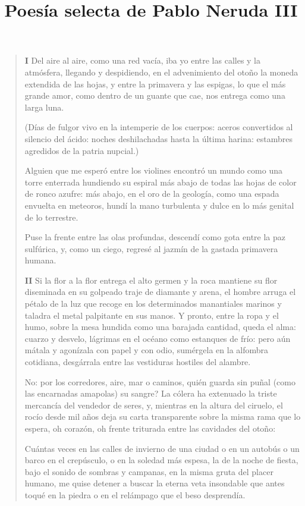 \documentclass[12pt]{article}
\date{}
\title{Poesía selecta de Pablo Neruda III}
\begin{document}
\maketitle
\tableofcontents

\clearpage
{}
\begin{verse}
\textbf{ I}
Del aire al aire, como una red vacía,  
iba yo entre las calles y la atmósfera, llegando y despidiendo,  
en el advenimiento del otoño la moneda extendida  
de las hojas, y entre la primavera y las espigas,  
lo que el más grande amor, como dentro de un guante  
que cae, nos entrega como una larga luna.  
	
(Días de fulgor vivo en la intemperie  
de los cuerpos: aceros convertidos  
al silencio del ácido:  
noches deshilachadas hasta la última harina:  
estambres agredidos de la patria nupcial.)  
	
Alguien que me esperó entre los violines  
encontró un mundo como una torre enterrada  
hundiendo su espiral más abajo de todas  
las hojas de color de ronco azufre:  
más abajo, en el oro de la geología,  
como una espada envuelta en meteoros,  
hundí la mano turbulenta y dulce  
en lo más genital de lo terrestre.  
	
Puse la frente entre las olas profundas,  
descendí como gota entre la paz sulfúrica,  
y, como un ciego, regresé al jazmín  
de la gastada primavera humana.  

\textbf{ II}
Si la flor a la flor entrega el alto germen  
y la roca mantiene su flor diseminada  
en su golpeado traje de diamante y arena,  
el hombre arruga el pétalo de la luz que recoge  
en los determinados manantiales marinos  
y taladra el metal palpitante en sus manos.  
Y pronto, entre la ropa y el humo, sobre la mesa hundida  
como una barajada cantidad, queda el alma:  
cuarzo y desvelo, lágrimas en el océano  
como estanques de frío: pero aún  
mátala y agonízala con papel y con odio,  
sumérgela en la alfombra cotidiana, desgárrala  
entre las vestiduras hostiles del alambre.  
	
No: por los corredores, aire, mar o caminos,  
quién guarda sin puñal (como las encarnadas  
amapolas) su sangre? La cólera ha extenuado  
la triste mercancía del vendedor de seres,  
y, mientras en la altura del ciruelo, el rocío  
desde mil años deja su carta transparente  
sobre la misma rama que lo espera, oh corazón, oh frente triturada  
entre las cavidades del otoño:  
	
Cuántas veces en las calles de invierno de una ciudad o en  
un autobús o un barco en el crepúsculo, o en la soledad  
más espesa, la de la noche de fiesta, bajo el sonido  
de sombras y campanas, en la misma gruta del placer humano,  
me quise detener a buscar la eterna veta insondable  
que antes toqué en la piedra o en el relámpago que el beso desprendía.  
	

\end{verse}
\end{document}
